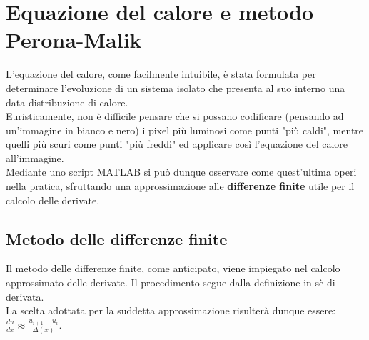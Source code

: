 \chapter{Equazione del calore e metodo Perona-Malik}
L'equazione del calore, come facilmente intuibile, è stata formulata per determinare l'evoluzione di un sistema isolato che presenta al suo interno una data distribuzione di calore.\\
Euristicamente, non è difficile pensare che si possano codificare (pensando ad un'immagine in bianco e nero) i pixel più luminosi come punti "più caldi", mentre quelli più scuri come punti "più freddi" ed applicare così l'equazione del calore all'immagine.\\
Mediante uno script MATLAB si può dunque osservare come quest'ultima operi nella pratica, sfruttando una approssimazione alle \textbf{differenze finite } utile per il calcolo delle derivate.\\
\section{Metodo delle differenze finite}
Il metodo delle differenze finite, come anticipato, viene impiegato nel calcolo approssimato delle derivate. Il procedimento segue dalla definizione in sè di derivata. \\La scelta adottata per la suddetta approssimazione risulterà dunque essere:\\
\vspace{2em}
\centering 
{\Large$\frac{du}{dx} \approx \frac{u_{i+1} - u_i}{\Delta(x)} $.}\\
~\\
~\\
~\\
~\\
~\\
~\\
~\\
~\\
~\\
~\\
~\\
~\\


